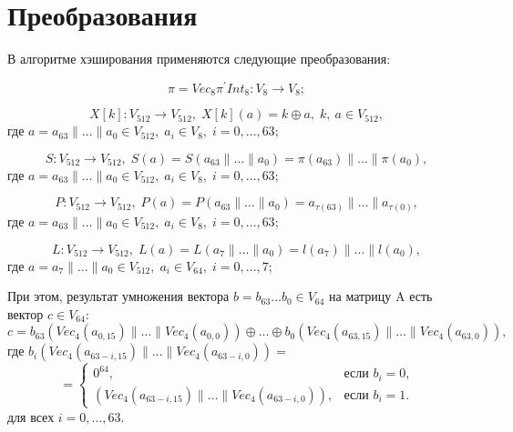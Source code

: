 \section{Преобразования}
\par
В алгоритме хэширования применяются следующие преобразования:
\par
\begin{equation}
\pi = Vec_{8}\pi^{'}Int_8\colon V_8 \to V_8;
\end{equation}
\par
\begin{equation}
X[k]\colon V_{512}\to V_{512},\;X[k](a)=k\oplus a,\; k,\:a\in V_{512},
\end{equation}
где $a=a_{63}\|\dots\|a_0\in V_{512},\; a_i\in V_8,\;i=0,\dots,63$;
\par
\begin{equation}
S\colon V_{512}\to V_{512},\; S(a)=S(a_{63}\|\dots \|a_0)=\pi (a_{63})\|\dots\|\pi (a_0),
\end{equation}
где $a=a_{63}\|\dots\|a_0\in V_{512},\; a_i\in V_8,\;i=0,\dots,63$;
\par
\begin{equation}
P\colon V_{512}\to V_{512},\; P(a)=P(a_{63}\|\dots \|a_0)=a_{\tau(63)}\|\dots\|a_{\tau(0)},
\end{equation}
где $a=a_{63}\|\dots\|a_0\in V_{512},\; a_i\in V_8,\;i=0,\dots,63$;
\par
\begin{equation}
L\colon V_{512}\to V_{512},\; L(a)=L(a_{7}\|\dots \|a_0)=l(a_7)\|\dots\|l(a_0),
\end{equation}
где $a=a_{7}\|\dots\|a_0\in V_{512},\; a_i\in V_{64},\;i=0,\dots,7$;
\par
При этом, результат умножения вектора $b=b_{63}\dots b_0 \in V_{64}$ на матрицу A есть вектор $c \in V_{64}$:
\begin{equation}\label{eq:lxor}
c=b_{63}(Vec_4(a_{0,15})\|\dots\|Vec_4(a_{0,0}))\oplus\dots\oplus b_{0}(Vec_4(a_{63,15})\|\dots\|Vec_4(a_{63,0})),
\end{equation}
где $b_{i}(Vec_4(a_{63-i,15})\|\dots\|Vec_4(a_{63-i,0}))
= $
\[
=
\begin{cases}
0^{64}, & \text{если $b_i = 0$,}\\
(Vec_4(a_{63-i,15})\|\dots\|Vec_4(a_{63-i,0})), & \text{если $b_i = 1$.}
\end{cases}
\]
для всех $i=0,\dots,63$.
